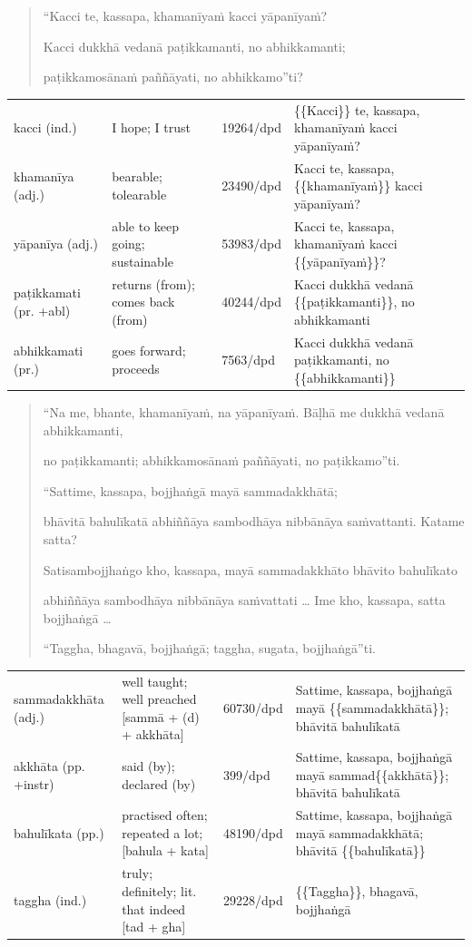 \documentclass[11pt,oneside]{memoir}
\begin{document}
\begin{quote}
“Kacci te, kassapa, khamanīyaṁ kacci yāpanīyaṁ?

Kacci dukkhā vedanā paṭikkamanti, no abhikkamanti;

paṭikkamosānaṁ paññāyati, no abhikkamo”ti?
\end{quote}

\begin{longtable}{L{\colOne} L{\colTwo} H H}
kacci (ind.) & I hope; I trust & 19264/dpd & \{\{Kacci\}\} te, kassapa, khamanīyaṁ kacci yāpanīyaṁ?\\[0pt]
khamanīya (adj.) & bearable; tolearable & 23490/dpd & Kacci te, kassapa, \{\{khamanīyaṁ\}\} kacci yāpanīyaṁ?\\[0pt]
yāpanīya (adj.) & able to keep going; sustainable & 53983/dpd & Kacci te, kassapa, khamanīyaṁ kacci \{\{yāpanīyaṁ\}\}?\\[0pt]
paṭikkamati (pr. +abl) & returns (from); comes back (from) & 40244/dpd & Kacci dukkhā vedanā \{\{paṭikkamanti\}\}, no abhikkamanti\\[0pt]
abhikkamati (pr.) & goes forward; proceeds & 7563/dpd & Kacci dukkhā vedanā paṭikkamanti, no \{\{abhikkamanti\}\}\\[0pt]
\end{longtable}

\begin{quote}
“Na me, bhante, khamanīyaṁ, na yāpanīyaṁ. Bāḷhā me dukkhā vedanā abhikkamanti,

no paṭikkamanti; abhikkamosānaṁ paññāyati, no paṭikkamo”ti.

“Sattime, kassapa, bojjhaṅgā mayā sammadakkhātā;

bhāvitā bahulīkatā abhiññāya sambodhāya nibbānāya saṁvattanti. Katame satta?

Satisambojjhaṅgo kho, kassapa, mayā sammadakkhāto bhāvito bahulīkato

abhiññāya sambodhāya nibbānāya saṁvattati \ldots{} Ime kho, kassapa, satta bojjhaṅgā \ldots{}

“Taggha, bhagavā, bojjhaṅgā; taggha, sugata, bojjhaṅgā”ti.
\end{quote}

\begin{longtable}{L{\colOne} L{\colTwo} H H}
sammadakkhāta (adj.) & well taught; well preached [sammā + (d) + akkhāta] & 60730/dpd & Sattime, kassapa, bojjhaṅgā mayā \{\{sammadakkhātā\}\}; bhāvitā bahulīkatā\\[0pt]
akkhāta (pp. +instr) & said (by); declared (by) & 399/dpd & Sattime, kassapa, bojjhaṅgā mayā sammad\{\{akkhātā\}\}; bhāvitā bahulīkatā\\[0pt]
bahulīkata (pp.) & practised often; repeated a lot; [bahula + kata] & 48190/dpd & Sattime, kassapa, bojjhaṅgā mayā sammadakkhātā; bhāvitā \{\{bahulīkatā\}\}\\[0pt]
taggha (ind.) & truly; definitely; lit. that indeed [tad + gha] & 29228/dpd & \{\{Taggha\}\}, bhagavā, bojjhaṅgā\\[0pt]
\end{longtable}
\end{document}
